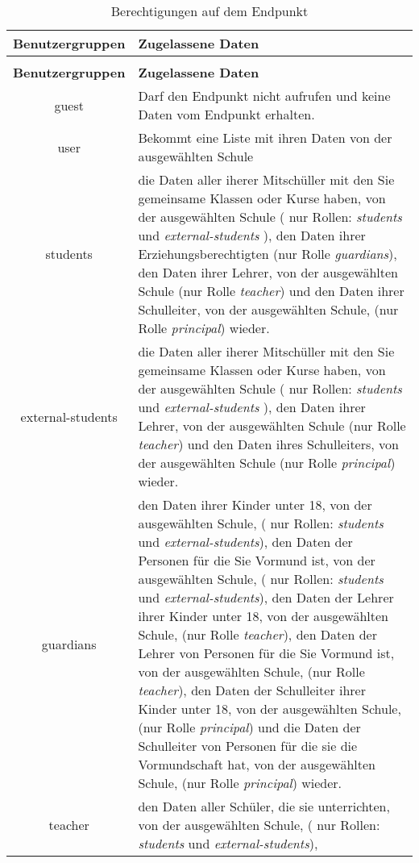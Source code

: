 \begin{longtable}{|c|p{}|}
		\caption{Berechtigungen auf dem Endpunkt}
		\label{tab:rest:api:school:users:id:get:right} \\
\hline
\textbf{Benutzergruppen} & \textbf{Zugelassene Daten} \\ \hline
\endfirsthead
\caption{Berechtigungen auf dem Endpunkt}\\
\hline
\textbf{Benutzergruppen} & \textbf{Zugelassene Daten} \\ \hline
\endhead
guest & Darf den Endpunkt nicht aufrufen und keine Daten vom Endpunkt erhalten. \\ \hline
user & Bekommt eine Liste mit ihren Daten von der ausgewählten Schule \\ \hline 
students & die Daten aller iherer Mitschüller mit den Sie gemeinsame Klassen oder Kurse haben, von der ausgewählten Schule ( nur Rollen: \textit{students} und \textit{external-students} ),
           den Daten ihrer Erziehungsberechtigten (nur Rolle \textit{guardians}), 
					 den Daten ihrer Lehrer, von der ausgewählten Schule (nur Rolle \textit{teacher}) und 
					 den Daten ihrer Schulleiter, von der ausgewählten Schule, (nur Rolle \textit{principal}) wieder.\\ \hline
external-students &  die Daten aller iherer Mitschüller mit den Sie gemeinsame Klassen oder Kurse haben, von der ausgewählten Schule ( nur Rollen: \textit{students} und \textit{external-students} ),
           den Daten ihrer Lehrer, von der ausgewählten Schule (nur Rolle \textit{teacher}) und 
					 den Daten ihres Schulleiters, von der ausgewählten Schule (nur Rolle \textit{principal}) wieder.\\ \hline
guardians & den Daten ihrer Kinder unter 18, von der ausgewählten Schule, ( nur Rollen: \textit{students} und \textit{external-students}), 
					den Daten der Personen für die Sie Vormund ist, von der ausgewählten Schule, ( nur Rollen: \textit{students} und \textit{external-students}), 
					den Daten der Lehrer ihrer Kinder unter 18, von der ausgewählten Schule, (nur Rolle \textit{teacher}),
					den Daten der Lehrer von Personen für die Sie Vormund ist, von der ausgewählten Schule, (nur Rolle \textit{teacher}),
					den Daten der Schulleiter ihrer Kinder unter 18, von der ausgewählten Schule, (nur Rolle \textit{principal}) und
					die Daten der Schulleiter von Personen für die sie die Vormundschaft hat, von der ausgewählten Schule, (nur Rolle \textit{principal})
					wieder.\\ \hline
teacher & den Daten aller Schüler, die sie unterrichten, von der ausgewählten Schule, ( nur Rollen: \textit{students} und \textit{external-students}),

\end{longtable}
